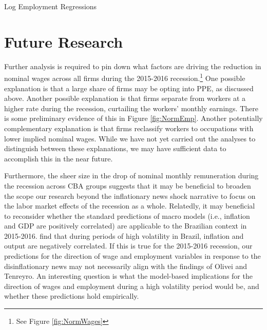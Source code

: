 \documentclass[12pt]{article}
\begin{document}
		\begin{table}[!ht]
			\caption{Log Employment Regressions}
			\label{tab:emp_reg}
			\tiny{}
		\end{table}

	\section{Future Research}
	Further analysis is required to pin down what factors are driving the reduction in nominal wages across all firms during the 2015-2016 recession.\footnote{See Figure \ref{fig:NormWages}} One possible explanation is that a large share of firms may be opting into PPE, as discussed above. Another possible explanation is that firms separate from workers at a higher rate during the recession, curtailing the workers' monthly earnings. There is some preliminary evidence of this in Figure \ref{fig:NormEmp}. Another potentially complementary explanation is that firms reclassify workers to occupations with lower implied nominal wages. While we have not yet carried out the analyses to distinguish between these explanations, we may have sufficient data to accomplish this in the near future.

	Furthermore, the sheer size in the drop of nominal monthly remuneration during the recession across CBA groups suggests that it may be beneficial to broaden the scope our research beyond the inflationary news shock narrative to focus on the labor market effects of the recession as a whole. Relatedly, it may beneficial to reconsider whether the standard predictions of macro models (i.e., inflation and GDP are positively correlated) are applicable to the Brazilian context in 2015-2016. \cite{goncalvesAssessingBrazilianMacroeconomic2016a} find that during periods of high volatility in Brazil, inflation and output are negatively correlated. If this is true for the 2015-2016 recession, our predictions for the direction of wage and employment  variables in response to the disinflationary news may not necessarily align with the findings of Olivei and Tenreyro. An interesting question is what the model-based implications for the direction of wages and employment during a high volatility period would be, and whether these predictions hold empirically.
\end{document}
